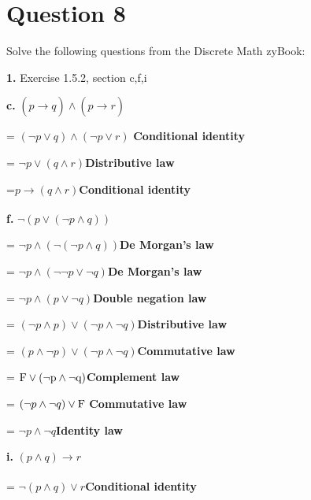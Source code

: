 \documentclass[11pt]{article}
\begin{document}
	\newpage
	\section*{Question 8}
	Solve the following questions from the Discrete Math zyBook:
	
	\textbf{1.} Exercise 1.5.2, section c,f,i
	\medskip
	
	\textbf{c.}
	$(p\xrightarrow[]{}q)\wedge (p\xrightarrow[]{}r)$
	
	= $(\neg p\vee q)\wedge (\neg p\vee r)$\hspace{5mm} \textbf{Conditional identity}
	
	= $\neg p\vee (q\wedge r)$\hspace{18mm}\textbf{Distributive law}
	
	=$p\xrightarrow[]{}(q\wedge r)$\hspace{20mm}\textbf{Conditional identity}
	\vspace{2mm}
	
	\textbf{f.}
	$\neg (p\vee (\neg p\wedge q))$

	= $\neg p\wedge (\neg (\neg p\wedge q))$\hspace{9mm}\textbf{De Morgan's law}
	
	= $\neg p\wedge (\neg \neg p\vee \neg q)$\hspace{10mm}\textbf{De Morgan's law}
	
	= $\neg p\wedge (p\vee \neg q)$\hspace{15mm}\textbf{Double negation law}
	
	= $(\neg p\wedge p)\vee (\neg p \wedge \neg q)$\hspace{3mm}\textbf{Distributive law}
	
	= $(p\wedge \neg p)\vee (\neg p\wedge \neg q)$\hspace{3mm}\textbf{Commutative law}
	
	= $\rm F\vee (\neg p\wedge \neg q)$\hspace{14.5mm}\textbf{Complement law}
	
	= $(\neg p\wedge \neg q)\vee \rm F$\hspace{14mm}
	\textbf{Commutative law}
	
	= $\neg p\wedge \neg q$\hspace{25mm}\textbf{Identity law}
	\vspace{2mm}
	
	\textbf{i.}
	$(p\wedge q)\xrightarrow[]{}r$
	
	= $\neg (p\wedge q)\vee r$\hspace{19mm}\textbf{Conditional identity}
	
\end{document}
